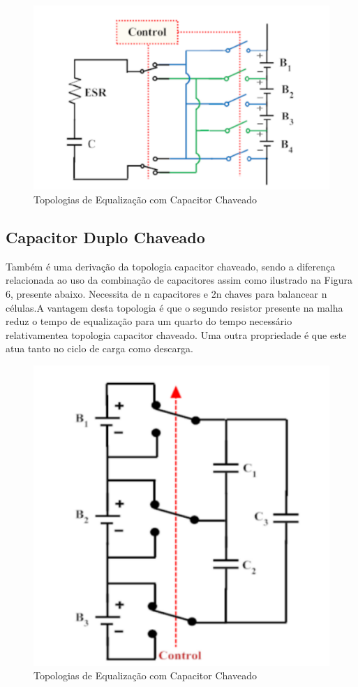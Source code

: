 \documentclass[11pt, a4paper, oneside]{article}
\begin{document}
\begin{figure}[h!]
\centering
\includegraphics[width=0.6\linewidth]{capacitor_unico_chaveado}
\caption{Topologias de Equalização com Capacitor Chaveado \cite{energy_figure}}
\label{fig:estrutura_equalizador_passivo_ apacitor}
\end{figure}

\subsection{Capacitor Duplo Chaveado}
Também é uma derivação da topologia capacitor chaveado, sendo a
diferença relacionada ao uso da combinação de capacitores assim como ilustrado
na Figura 6, presente abaixo. Necessita de n capacitores e 2n chaves para
balancear n células.A vantagem desta topologia é que o segundo resistor presente
na malha reduz o tempo de equalização para um quarto do tempo necessário
relativamentea topologia capacitor chaveado. Uma outra propriedade é que este
atua tanto no ciclo de carga como descarga.	

\begin{figure}[h!]
\centering
\includegraphics[width=0.6\linewidth]{capacitor_chaveado_duplo}
\caption{Topologias de Equalização com Capacitor Chaveado \cite{energy_figure}}
\label{fig:estrutura_equalizador_passivo_ apacitor}
\end{figure}
\end{document}
